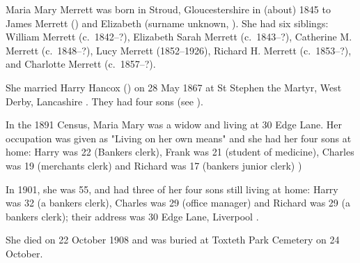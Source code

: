 
Maria Mary Merrett was born in Stroud, Gloucestershire in (about) 1845 to James Merrett () and Elizabeth (surname unknown, ).
She had  six siblings: William Merrett (c.~1842--?), Elizabeth Sarah Merrett (c.~1843--?), Catherine M. Merrett (c.~1848--?), Lucy Merrett (1852--1926), Richard H. Merrett (c.~1853--?), and Charlotte Merrett (c.~1857--?).

She married Harry Hancox () on 28 May 1867 at St Stephen the Martyr, West Derby, Lancashire \cite{MariaMerrettMarriage}. They had four sons (see ).

In the 1891 Census, Maria Mary was a widow and living at 30 Edge Lane. Her occupation was given as "Living on her own means" and she had her four sons at home: Harry was 22 (Bankers clerk), Frank was 21 (student of medicine), Charles was 19 (merchants clerk) and Richard was 17 (bankers junior clerk) \cite{MariaMerrettOccupation})

In 1901, she was 55, and had three of her four sons still living at home: Harry was 32 (a bankers clerk), Charles was 29 (office manager) and Richard was 29 (a bankers clerk); their address was 30 Edge Lane, Liverpool \cite{MariaMerrettResidence}.

She died on 22 October 1908 and was buried at Toxteth Park Cemetery on 24 October. \cite{MariaMerrettDeath}
